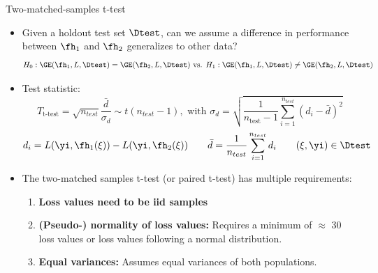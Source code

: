 \documentclass[11pt,compress,t,notes=noshow, aspectratio=169, xcolor=table]{beamer}
\begin{document}
\begin{frame}{Two-matched-samples t-test}



    \begin{itemize}
        \item Given a holdout test set $\Dtest$, can we assume a difference in performance between $\fh_1$ and $\fh_2$ generalizes to other data?
        $$H_0: \GE(\fh_1, L, \Dtest) = \GE(\fh_2, L, \Dtest) \text{ vs. } H_1: \GE(\fh_1, L, \Dtest) \neq \GE(\fh_2, L, \Dtest)$$
        \item Test statistic:
            $$
            T_{\text{t-test}} = \sqrt{n_{test}} \frac{\bar{d}}{\sigma_{d}} \sim t(n_{test} - 1), \text{ with }
            \sigma_{d} = \sqrt{\frac{1}{n_{\text{test}} - 1}\sum_{i=1}^{n_{test}} \left(d_i - \bar{d} \right)^2}
        $$
        $$d_i = L(\yi, \fh_1 (\xi)) - L(\yi, \fh_2 (\xi))\qquad \bar{d} = \frac{1}{n_{test}} \sum\limits_{i=1}^{n_{test}} d_i \qquad (\xi, \yi) \in \Dtest$$
        \item The two-matched samples t-test (or paired t-test) has multiple requirements:
        \begin{enumerate}
            \item \textbf{Loss values need to be iid samples} %

            \item \textbf{(Pseudo-) normality of loss values:}
            Requires a minimum of $\approx$ 30 loss values or loss values following a normal distribution.
            \item \textbf{Equal variances:} Assumes equal variances of both populations. %
        \end{enumerate}
    \end{itemize}
\end{frame}

\end{document}
